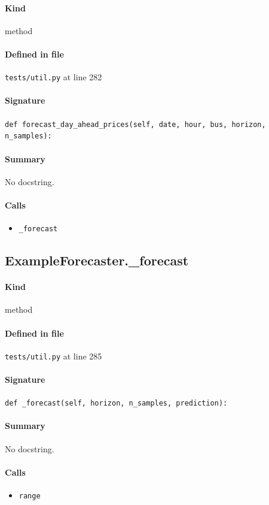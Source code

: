 \documentclass[11pt]{report}
\begin{document}
\paragraph{Kind} method
\paragraph{Defined in file} \texttt{tests/util.py} at line 282
\paragraph{Signature} \texttt{def forecast\_day\_ahead\_prices(self, date, hour, bus, horizon, n\_samples):}
\paragraph{Summary} No docstring.
\paragraph{Calls}
\begin{itemize}[leftmargin=*]
  \item \texttt{\_forecast}
\end{itemize}
\subsection{ExampleForecaster.\_forecast}
\label{def:tests-util.py:ExampleForecaster._forecast:L285}
\paragraph{Kind} method
\paragraph{Defined in file} \texttt{tests/util.py} at line 285
\paragraph{Signature} \texttt{def \_forecast(self, horizon, n\_samples, prediction):}
\paragraph{Summary} No docstring.
\paragraph{Calls}
\begin{itemize}[leftmargin=*]
  \item \texttt{range}
\end{itemize}
\end{document}
